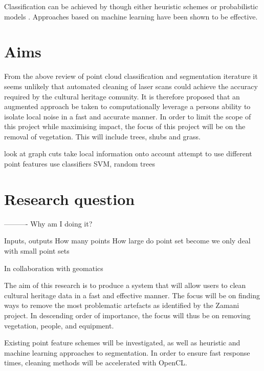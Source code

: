 \documentclass[10pt,twocolumn]{article}
\begin{document}
Classification can be achieved by though either heuristic schemes \cite{Spina2010} or probabilistic models \cite{Shapovalov2010,Rusu2009}. Approaches based on machine learning have been shown to be effective.




\section{Aims}
From the above review of point cloud classification and segmentation iterature it seems unlikely that automated cleaning of laser scans could achieve the accuracy required by the cultural heritage comunity. It is therefore proposed that an augmented approach be taken to computationally leverage a persons ability to isolate local noise in a fast and accurate manner. In order to limit the scope of this project while maximising impact, the focus of this project will be on the removal of vegetation. This will include trees, shubs and grass.

look at graph cuts
take local information onto account
attempt to use different point features
use classifiers SVM, random trees

\section{Research question}

----------
Why am I doing it?

Inputs, outputs
How many points
How large do point set become
we only deal with small point sets



In collaboration with geomatics

The aim of this research is to produce a system that will allow users to clean cultural heritage data in a fast and effective manner. The focus will be on finding ways to remove the most problematic artefacts as identified by the Zamani project. In descending order of importance, the focus will thus be on removing vegetation, people, and equipment. 

Existing point feature schemes will be investigated, as well as heuristic and machine learning approaches to segmentation. In order to ensure fast response times, cleaning methods will be accelerated with OpenCL.
\end{document}
